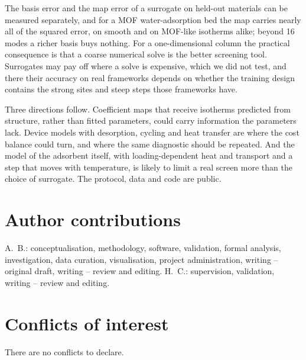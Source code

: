 \documentclass[10pt,a4paper]{article}
\begin{document}
The basis error and the map error of a surrogate on held-out materials can be measured
separately, and for a MOF water-adsorption bed the map carries nearly all of the squared
error, on smooth and on MOF-like isotherms alike; beyond 16 modes a richer basis buys
nothing. For a one-dimensional column the practical consequence is that a coarse numerical
solve is the better screening tool. Surrogates may pay off where a solve is expensive, which
we did not test, and there their accuracy on real frameworks depends on whether the training
design contains the strong sites and steep steps those frameworks have.

Three directions follow. Coefficient maps that receive isotherms predicted from structure,
rather than fitted parameters, could carry information the parameters lack. Device models
with desorption, cycling and heat transfer are where the cost balance could turn, and where
the same diagnostic should be repeated. And the model of the adsorbent itself, with
loading-dependent heat and transport and a step that moves with temperature, is likely to
limit a real screen more than the choice of surrogate. The protocol, data and code are
public.

\section*{Author contributions}
A.~B.: conceptualisation, methodology, software, validation, formal analysis,
investigation, data curation, visualisation, project administration, writing --
original draft, writing -- review and editing. H.~C.:
supervision, validation, writing -- review and editing.

\section*{Conflicts of interest}
There are no conflicts to declare.
\end{document}
